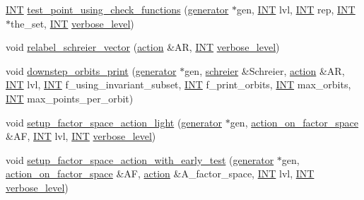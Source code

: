 \begin{DoxyCompactItemize}
\item 
\mbox{\hyperlink{galois_8h_a09fddde158a3a20bd2dcadb609de11dc}{I\+NT}} \mbox{\hyperlink{classoracle_aea2e35ca2b51a9251711735f6080217f}{test\+\_\+point\+\_\+using\+\_\+check\+\_\+functions}} (\mbox{\hyperlink{classgenerator}{generator}} $\ast$gen, \mbox{\hyperlink{galois_8h_a09fddde158a3a20bd2dcadb609de11dc}{I\+NT}} lvl, \mbox{\hyperlink{galois_8h_a09fddde158a3a20bd2dcadb609de11dc}{I\+NT}} rep, \mbox{\hyperlink{galois_8h_a09fddde158a3a20bd2dcadb609de11dc}{I\+NT}} $\ast$the\+\_\+set, \mbox{\hyperlink{galois_8h_a09fddde158a3a20bd2dcadb609de11dc}{I\+NT}} \mbox{\hyperlink{simeon_8_c_a818073fbcc2f439e7c56952f67386122}{verbose\+\_\+level}})
\item 
void \mbox{\hyperlink{classoracle_ab19d660985a6f027045bd1eb12a388d1}{relabel\+\_\+schreier\+\_\+vector}} (\mbox{\hyperlink{classaction}{action}} \&AR, \mbox{\hyperlink{galois_8h_a09fddde158a3a20bd2dcadb609de11dc}{I\+NT}} \mbox{\hyperlink{simeon_8_c_a818073fbcc2f439e7c56952f67386122}{verbose\+\_\+level}})
\item 
void \mbox{\hyperlink{classoracle_a7c267cd92618aacf63d6fb3d8730df33}{downstep\+\_\+orbits\+\_\+print}} (\mbox{\hyperlink{classgenerator}{generator}} $\ast$gen, \mbox{\hyperlink{classschreier}{schreier}} \&Schreier, \mbox{\hyperlink{classaction}{action}} \&AR, \mbox{\hyperlink{galois_8h_a09fddde158a3a20bd2dcadb609de11dc}{I\+NT}} lvl, \mbox{\hyperlink{galois_8h_a09fddde158a3a20bd2dcadb609de11dc}{I\+NT}} f\+\_\+using\+\_\+invariant\+\_\+subset, \mbox{\hyperlink{galois_8h_a09fddde158a3a20bd2dcadb609de11dc}{I\+NT}} f\+\_\+print\+\_\+orbits, \mbox{\hyperlink{galois_8h_a09fddde158a3a20bd2dcadb609de11dc}{I\+NT}} max\+\_\+orbits, \mbox{\hyperlink{galois_8h_a09fddde158a3a20bd2dcadb609de11dc}{I\+NT}} max\+\_\+points\+\_\+per\+\_\+orbit)
\item 
void \mbox{\hyperlink{classoracle_aaa6ca8694ae3452bc3ca812cbcc80fc7}{setup\+\_\+factor\+\_\+space\+\_\+action\+\_\+light}} (\mbox{\hyperlink{classgenerator}{generator}} $\ast$gen, \mbox{\hyperlink{classaction__on__factor__space}{action\+\_\+on\+\_\+factor\+\_\+space}} \&AF, \mbox{\hyperlink{galois_8h_a09fddde158a3a20bd2dcadb609de11dc}{I\+NT}} lvl, \mbox{\hyperlink{galois_8h_a09fddde158a3a20bd2dcadb609de11dc}{I\+NT}} \mbox{\hyperlink{simeon_8_c_a818073fbcc2f439e7c56952f67386122}{verbose\+\_\+level}})
\item 
void \mbox{\hyperlink{classoracle_a7c26a85886666829e9727df91d2f01ad}{setup\+\_\+factor\+\_\+space\+\_\+action\+\_\+with\+\_\+early\+\_\+test}} (\mbox{\hyperlink{classgenerator}{generator}} $\ast$gen, \mbox{\hyperlink{classaction__on__factor__space}{action\+\_\+on\+\_\+factor\+\_\+space}} \&AF, \mbox{\hyperlink{classaction}{action}} \&A\+\_\+factor\+\_\+space, \mbox{\hyperlink{galois_8h_a09fddde158a3a20bd2dcadb609de11dc}{I\+NT}} lvl, \mbox{\hyperlink{galois_8h_a09fddde158a3a20bd2dcadb609de11dc}{I\+NT}} \mbox{\hyperlink{simeon_8_c_a818073fbcc2f439e7c56952f67386122}{verbose\+\_\+level}})

\end{DoxyCompactItemize}
